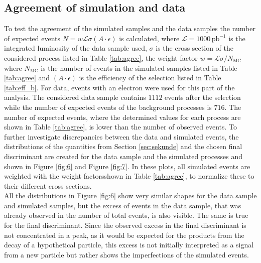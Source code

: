 \subsection{Agreement of simulation and data}
To test the agreement of the simulated samples and the data samples the number of expected events $N = w \mathcal{L} \sigma (A \cdot \epsilon)$ is calculated,
where $\mathcal{L} = 1000 \, \si{\pico\barn\tothe{-1}}$ is the integrated luminosity of the data sample used, $\sigma$ is the cross section of the considered
process listed in Table \ref{tab:agree}, the weight factor $w = \mathcal{L} \sigma / N_\text{MC}$ where $N_\text{MC}$ is the number of events in the
simulated samples listed in Table \ref{tab:agree} and $(A \cdot \epsilon)$ is the efficiency of the selection listed in Table \ref{tab:eff_b}.
For data, events with an electron were used for this part of the analysis.
The considered data sample contains $1112$ events after the selection while the number of expected events of the background processes is $716$.
The number of expected events, where the determined values for each process are shown in Table \ref{tab:agree}, is lower than the number of observed events.
To further investigate discrepancies between the data and simulated events, the distributions of the quantities from Section \ref{sec:sekunde} and the
chosen final discriminant are created for the data sample and the simulated processes and shown in Figure \ref{fig:6} and Figure \ref{fig:7}.
In these plots, all simulated events are weighted with the weight factorsshown in Table \ref{tab:agree}, to normalize these to their different cross
sections.\\
All the distributions in Figure \ref{fig:6} show very similar shapes for the data sample and simulated samples, but the excess of events in the
data sample, that was already observed in the number of total events, is also visible. The same is true for the final discriminant.
Since the observed excess in the final discriminant is not concentrated in a peak, as it would be expected for the products from the
decay of a hypothetical particle, this excess is not initially interpreted as a signal from a new particle but rather shows the imperfections
of the simulated events.


